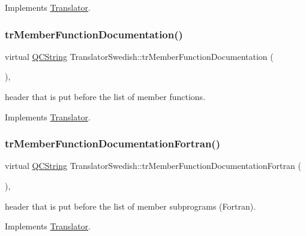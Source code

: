 Implements \mbox{\hyperlink{class_translator}{Translator}}.

\mbox{\label{class_translator_swedish_ac77ff422e21e77dff023a1e9fde30a36}} 
\subsubsection{\texorpdfstring{trMemberFunctionDocumentation()}{trMemberFunctionDocumentation()}}
{\footnotesize\ttfamily virtual \mbox{\hyperlink{class_q_c_string}{Q\+C\+String}} Translator\+Swedish\+::tr\+Member\+Function\+Documentation (\begin{DoxyParamCaption}{ }\end{DoxyParamCaption})\hspace{0.3cm}{\ttfamily [inline]}, {\ttfamily [virtual]}}

header that is put before the list of member functions. 

Implements \mbox{\hyperlink{class_translator}{Translator}}.

\mbox{\label{class_translator_swedish_a99b9fd67ade3307a33004e1bd2f75525}} 
\subsubsection{\texorpdfstring{trMemberFunctionDocumentationFortran()}{trMemberFunctionDocumentationFortran()}}
{\footnotesize\ttfamily virtual \mbox{\hyperlink{class_q_c_string}{Q\+C\+String}} Translator\+Swedish\+::tr\+Member\+Function\+Documentation\+Fortran (\begin{DoxyParamCaption}{ }\end{DoxyParamCaption})\hspace{0.3cm}{\ttfamily [inline]}, {\ttfamily [virtual]}}

header that is put before the list of member subprograms (Fortran). 

Implements \mbox{\hyperlink{class_translator}{Translator}}.

